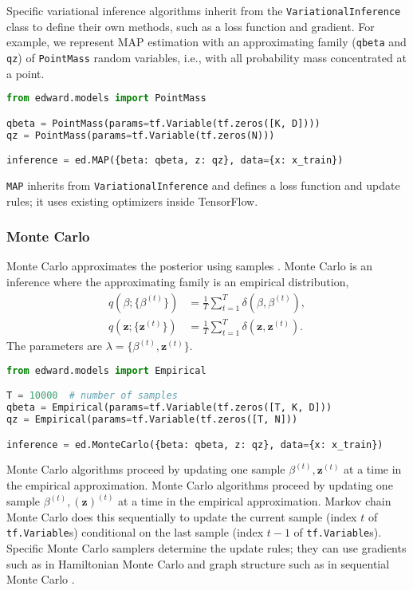 Specific variational inference algorithms inherit from
the \texttt{VariationalInference} class to define their own methods, such as a
loss function and gradient.
For example, we represent
MAP
estimation with an approximating family (\texttt{qbeta} and
\texttt{qz}) of \texttt{PointMass} random variables, i.e., with all
probability mass concentrated at a point.
\begin{lstlisting}[language=Python]
from edward.models import PointMass

qbeta = PointMass(params=tf.Variable(tf.zeros([K, D])))
qz = PointMass(params=tf.Variable(tf.zeros(N)))

inference = ed.MAP({beta: qbeta, z: qz}, data={x: x_train})
\end{lstlisting}
\texttt{MAP} inherits from \texttt{VariationalInference} and defines a
loss function and update rules; it uses existing optimizers inside
TensorFlow.

\subsubsection{Monte Carlo}

Monte Carlo approximates the posterior using samples
\citep{robert1999monte}. Monte Carlo is an inference where the
approximating family is an empirical distribution,
\begin{align*}
q(\beta; \{\beta^{(t)}\})
&= \frac{1}{T}\sum_{t=1}^T \delta(\beta, \beta^{(t)}), \\[1.5ex]
q(\mathbf{z}; \{\mathbf{z}^{(t)}\})
&= \frac{1}{T}\sum_{t=1}^T \delta(\mathbf{z}, \mathbf{z}^{(t)}).
\end{align*}
The parameters are $\lambda=\{\beta^{(t)},\mathbf{z}^{(t)}\}$.
\begin{lstlisting}[language=Python]
from edward.models import Empirical

T = 10000  # number of samples
qbeta = Empirical(params=tf.Variable(tf.zeros([T, K, D]))
qz = Empirical(params=tf.Variable(tf.zeros([T, N]))

inference = ed.MonteCarlo({beta: qbeta, z: qz}, data={x: x_train})
\end{lstlisting}
Monte Carlo
algorithms proceed by updating one sample $\beta^{(t)},\mathbf{z}^{(t)}$ at a time in the empirical
approximation.
Monte Carlo algorithms proceed by updating one sample
$\beta^{(t)},\mathbf{(z)}^{(t)}$ at a time in the empirical approximation.
%
Markov chain Monte Carlo does this sequentially to update
the current sample (index $t$ of \texttt{tf.Variable}s) conditional on
the last sample (index $t-1$ of \texttt{tf.Variable}s).
%
Specific Monte Carlo samplers determine the update rules;
they can use gradients such as in Hamiltonian Monte Carlo
\citep{neal2011mcmc} and graph
structure such as in sequential Monte Carlo \citep{doucet2001introduction}.

